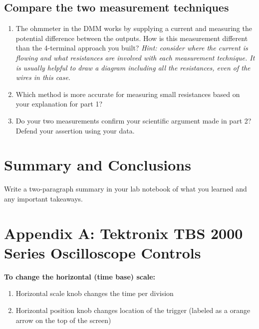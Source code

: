 \documentclass[
]{article}
\begin{document}
\hypertarget{compare-the-two-measurement-techniques}{%
\subsection{Compare the two measurement
techniques}\label{compare-the-two-measurement-techniques}}

\begin{enumerate}
\def\labelenumi{\arabic{enumi}.}
\item
  The ohmmeter in the DMM works by supplying a current and measuring the
  potential difference between the outputs. How is this measurement
  different than the 4-terminal approach you built? \emph{Hint: consider
  where the current is flowing and what resistances are involved with
  each measurement technique. It is usually helpful to draw a diagram
  including all the resistances, even of the wires in this case.}
\item
  Which method is more accurate for measuring small resistances based on
  your explanation for part 1?
\item
  Do your two measurements confirm your scientific argument made in part
  2? Defend your assertion using your data.
\end{enumerate}

\hypertarget{summary-and-conclusions}{%
\section{Summary and Conclusions}\label{summary-and-conclusions}}

Write a two-paragraph summary in your lab notebook of what you learned
and any important takeaways.

\hypertarget{appendix-a-tektronix-tbs-2000-series-oscilloscope-controls}{%
\section*{Appendix A: Tektronix TBS 2000 Series Oscilloscope
Controls}\label{appendix-a-tektronix-tbs-2000-series-oscilloscope-controls}}

\textbf{To change the horizontal (time base) scale:}

\begin{enumerate}
\def\labelenumi{\arabic{enumi}.}
\item
  Horizontal scale knob changes the time per division
\item
  Horizontal position knob changes location of the trigger (labeled as a
  orange arrow on the top of the screen)
\end{enumerate}
\end{document}
